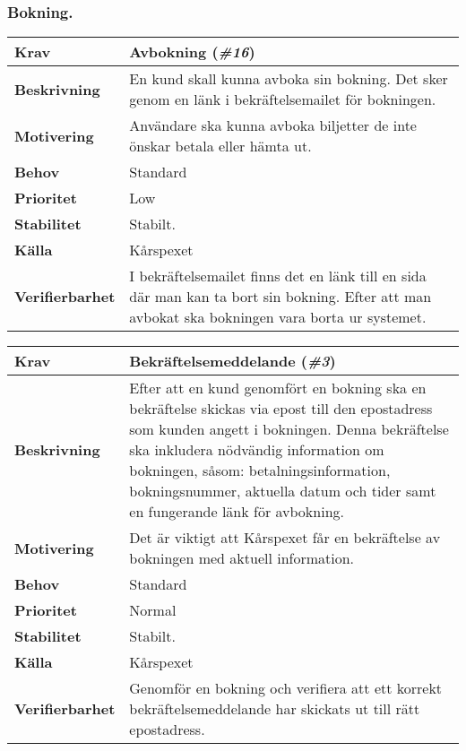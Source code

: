 \documentclass[a4paper, twoside, 11pt, titlepage]{article}
\begin{document}
		\subsubsection{Bokning.}


		\begin{tabular} { p{2.6cm} p{12.5cm} }
			\hline
			\sffamily\textbf{Krav} & Avbokning (\emph{\#16})  \\
			\hline
			\sffamily\textbf{Beskrivning} & En kund skall kunna avboka sin bokning. Det sker genom en länk i bekräftelsemailet för bokningen.  \\
			\hline
			\sffamily\textbf{Motivering} & Användare ska kunna avboka biljetter de inte önskar betala eller hämta ut.  \\
			\hline
			\sffamily\textbf{Behov} & Standard  \\
			\hline
			\sffamily\textbf{Prioritet} & Low  \\
			\hline
			\sffamily\textbf{Stabilitet} & Stabilt.  \\
			\hline
			\sffamily\textbf{Källa} & Kårspexet  \\
			\hline
			\sffamily\textbf{Verifierbarhet} & I bekräftelsemailet finns det en länk till en sida där man kan ta bort sin bokning. Efter att man avbokat ska bokningen vara borta ur systemet.  \\
			\hline
		\end{tabular}
		\vspace{6mm}

		\begin{tabular} { p{2.6cm} p{12.5cm} }
			\hline
			\sffamily\textbf{Krav} & Bekräftelsemeddelande (\emph{\#3})  \\
			\hline
			\sffamily\textbf{Beskrivning} & Efter att en kund genomfört en bokning ska en bekräftelse skickas via epost till den epostadress som kunden angett i bokningen. Denna bekräftelse ska inkludera nödvändig information om bokningen, såsom: betalningsinformation, bokningsnummer, aktuella datum och tider samt en fungerande länk för avbokning.  \\
			\hline
			\sffamily\textbf{Motivering} & Det är viktigt att Kårspexet får en bekräftelse av bokningen med aktuell information.  \\
			\hline
			\sffamily\textbf{Behov} & Standard  \\
			\hline
			\sffamily\textbf{Prioritet} & Normal  \\
			\hline
			\sffamily\textbf{Stabilitet} & Stabilt.  \\
			\hline
			\sffamily\textbf{Källa} & Kårspexet  \\
			\hline
			\sffamily\textbf{Verifierbarhet} & Genomför en bokning och verifiera att ett korrekt bekräftelsemeddelande har skickats ut till rätt epostadress.  \\
			\hline
		\end{tabular}
		\vspace{6mm}
\end{document}
